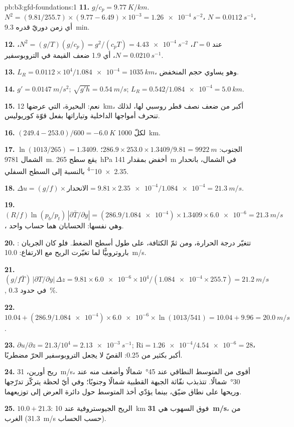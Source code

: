 \begin{solution}{pb:b3:gfd-foundations:1}
\textbf{11.} $g/c_p = \qty{9.77}{K/km}$. $N^2 = (9.81/255.7)\times(9.77 -
6.49)\times10^{-3} = \qty{1.26e-4}{s^{-2}}$، $N = \qty{0.0112}{s^{-1}}$، أي
زمن دوريّ قدره \qty{9.3}{min}.

\textbf{12.} عند $\Gamma = 0$، $N^2 = (g/T)(g/c_p) = g^2/(c_pT) =
\qty{4.43e-4}{s^{-2}}$، $N = \qty{0.0210}{s^{-1}}$، أي 1.9 ضعف
القيمة في التروبوسفير.

\textbf{13.} $L_R = 0.0112\times10^4/\num{1.084e-4} = \qty{1035}{km}$، وهو
يساوي حجم المنخفض.

\textbf{14.} $g' = \qty{0.0147}{m/s^2}$; $\sqrt{g'h} = \qty{0.54}{m/s}$;
$L_R = 0.542/\num{1.084e-4} = \qty{5.0}{km}$.

\textbf{15.} نعم: البحيرة، التي عرضها \qty{12}{km}، أكبر من ضعف
نصف قطر روسبي لها، لذلك تنحرف أمواجها الداخلية وتياراتها بفعل
قوّة كوريوليس.

\textbf{16.} $(249.4 - 253.0)/600 = \qty{-6.0}{K}$ لكلّ \qty{1000}{km}.

\textbf{17.} $\ln(1013/265) = 1.3409$. الجنوب:
$286.9\times253.0\times1.3409/9.81 = \qty{9922}{m}$؛ الشمال \qty{9781}{m}.
يقع سطح \qty{265}{hPa} أخفض بمقدار \qty{141}{m} في الشمال، بانحدار
\num{2.35e-4} بالنسبة إلى السطح السفلي.

\textbf{18.} $\Delta u = (g/f)\times\text{الانحدار} = 9.81\times\num{2.35e-4}/
\num{1.084e-4} = \qty{21.3}{m/s}$.

\textbf{19.} $(R/f)\ln(p_b/p_t)\,|\partial\bar T/\partial y| =
(286.9/\num{1.084e-4})\times1.3409\times\num{6.0e-6} = \qty{21.3}{m/s}$، وهي
نفسها: الحسابان هما حساب واحد.

\textbf{20.} : تتغيّر درجة الحرارة، ومن ثمّ الكثافة، على طول
أسطح الضغط. فلو كان الجريان باروتروبيًّا لما تغيّرت الريح مع الارتفاع:
\qty{10.0}{m/s}.

\textbf{21.} $(g/f\bar T)\,|\partial T/\partial y|\,\Delta z = 9.81\times
\num{6.0e-6}\times10^4/(\num{1.084e-4}\times255.7) = \qty{21.2}{m/s}$,
في حدود \qty{0.3}{\percent}.

\textbf{22.} $10.04 + (286.9/\num{1.084e-4})\times\num{6.0e-6}\times
\ln(1013/541) = 10.04 + 9.96 = \qty{20.0}{m/s}$.

\textbf{23.} $\partial u/\partial z = 21.3/10^4 = \qty{2.13e-3}{s^{-1}}$;
$\mathrm{Ri} = \num{1.26e-4}/\num{4.54e-6} = 28$، أكبر بكثير من 0.25: القصّ
لا يجعل التروبوسفير الحرّ مضطربًا.

\textbf{24.} ريح أورين، \qty{31}{m/s}، أقوى من المتوسط النطاقي
عند \ang{45}~شمالًا وأضعف منه عند \ang{30}~شمالًا. تتذبذب نفّاثة الجبهة القطبية
شمالًا وجنوبًا؛ وفي أيّ لحظة يتركّز تدرّجها وريحها
على نطاق ضيّق، بينما يؤدّي أخذ المتوسط حول دائرة العرض إلى توزيعهما.

\textbf{25.} $10.0 + 21.3$: الريح الجيوستروفية عند \qty{10}{km} فوق
السهوب هي \textbf{\qty[text-series-to-math=true]{31}{m/s}}، من الغرب
(\qty{31.3}{m/s} حسب الحساب).
\end{solution}
